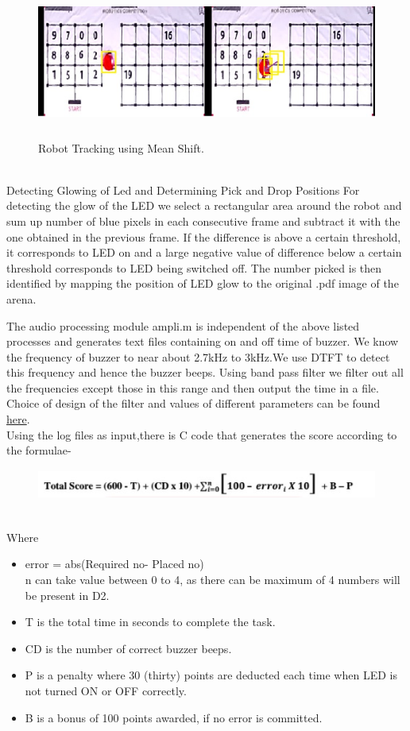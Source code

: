\documentclass[a4paper,12pt,oneside]{book}
\begin{document}
    \begin{figure}[h!]
		\includegraphics[width=1\linewidth, height=5cm]{ROI1.jpg}
		\centering
		\caption{Robot Tracking using Mean Shift.}
	\end{figure}\\
Detecting Glowing of Led and Determining Pick and Drop Positions
For detecting the glow of the LED we select a rectangular area around the robot and sum up number of blue pixels in each consecutive frame and subtract it with the one obtained in the previous frame. If the difference is above a certain threshold, it corresponds to LED on and a large negative value of difference below a certain threshold corresponds to LED being switched off. The number picked is then identified by mapping the position of LED glow to the original .pdf image of the arena.  

The audio processing module ampli.m is independent of the above listed processes and generates text files containing on and off time of buzzer.
We know the frequency of buzzer to near about 2.7kHz to 3kHz.We use DTFT to detect this frequency and hence the buzzer beeps. Using band pass filter we filter out all the frequencies except those in this range and then output the time in a file. Choice of design of the filter and values of different parameters can be found \href{http://in.mathworks.com/help/dsp/ref/bandpassfilter.html}{here}.\\
Using the log files as input,there is C code that generates the score according to the formulae-
\begin{figure}[h!]
		\includegraphics[width=1\linewidth, height=1cm]{score.jpg}
	\end{figure}\\
Where
\begin{itemize}
\item  error = abs(Required no- Placed no)\\ 
n can take value between 0 to 4, as there can be maximum of 4 numbers will
be present in D2.
\item T is the total time in seconds to complete the task.
\item CD is the number of correct buzzer beeps.
\item P is a penalty where 30 (thirty) points are deducted each time when LED is not turned ON or OFF correctly.
\item B is a bonus of 100 points awarded, if no error is committed.
\end{itemize}
\end{document}
